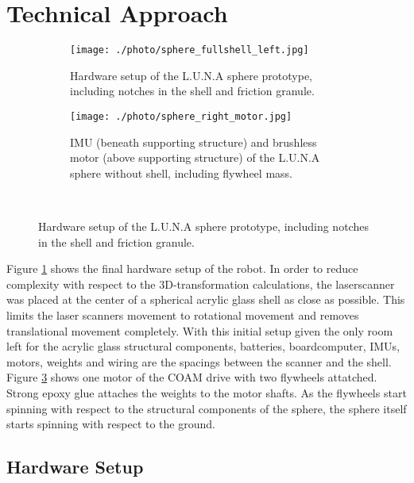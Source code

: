 \section{Technical Approach}
\label{sec:TechnicalApproach}

\begin{figure}
\centering
\begin{subfigure}[b]{0.64\textwidth}
        \centering
        \texttt{[image: ./photo/sphere\_fullshell\_left.jpg]}
        \caption{Hardware setup of the L.U.N.A sphere prototype, including notches in the shell and friction granule.}
        \label{sec:TechnicalApproach:fig:prototype}
\end{subfigure}
\hfill
\begin{subfigure}[b]{0.34\textwidth}
        \centering
        \texttt{[image: ./photo/sphere\_right\_motor.jpg]}
        \caption{IMU (beneath supporting structure) and brushless motor (above supporting structure) of the L.U.N.A sphere without shell, including flywheel mass. }
        \label{sec:TechnicalApproach:fig:motor}
\end{subfigure}
\\
\caption{Hardware setup of the L.U.N.A sphere prototype, including notches in the shell and friction granule.}
\end{figure}

Figure \ref{sec:TechnicalApproach:fig:prototype} shows the final hardware setup of the robot. In order to reduce complexity with respect to the 3D-transformation calculations, the laserscanner was placed at the center of a spherical acrylic glass shell as close as possible. This limits the laser scanners movement to rotational movement and removes translational movement completely. With this initial setup given the only room left for the acrylic glass structural components, batteries, boardcomputer, IMUs, motors, weights and wiring are the spacings between the scanner and the shell. Figure \ref{sec:TechnicalApproach:fig:motor} shows one 
motor of the COAM drive with two flywheels attatched. Strong epoxy glue attaches the weights to the motor shafts. As the flywheels start spinning with respect to the structural components of the sphere, the sphere itself starts spinning with respect to the ground. 

\subsection{Hardware Setup}
\label{sec:TechnicalApproach:HardwareSetup}

